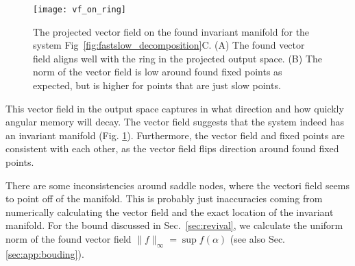 \documentclass{article} %
\newcounter{ct}
\theoremstyle{definition}
\theoremstyle{remark}
\begin{document}
  
 \begin{figure}[tbhp]
     \centering
    \texttt{[image: vf\_on\_ring]}
       \caption{The projected vector field on the found invariant manifold for the system Fig~\ref{fig:fastslow_decomposition}C.
       (A) The found vector field aligns well with the ring in the projected output space.
       (B) The norm of the vector field is low around found fixed points as expected, but is higher for points that are just slow points.
       }
         \label{fig:vf_on_ring}
\end{figure}
 
This vector field in the output space captures in what direction and how quickly angular memory will decay. 
 The vector field  suggests that the system indeed has an invariant manifold (Fig. \ref{fig:vf_on_ring}).
 Furthermore, the vector field and fixed points are consistent with each other, as the vector field flips direction around found fixed points.

 
 There are some inconsistencies around saddle nodes, where the vectori field seems to point off of the manifold.	
 This is probably just inaccuracies  coming from numerically calculating the vector field and the exact location of the invariant manifold.
%
For the bound discussed in Sec.~\ref{sec:revival}, we calculate the uniform norm of the found vector field $\|f\|_\infty = \sup f(\alpha)$ (see also Sec. \ref{sec:app:bouding}).
\end{document}

